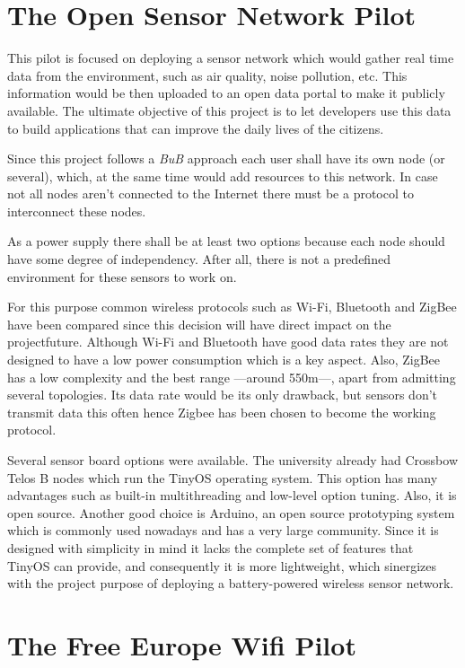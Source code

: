 \documentclass[draftclsnofoot,12pt,journal,onecolumn]{IEEEtran}
\begin{document}
\section{The Open Sensor Network Pilot}

This pilot is focused on deploying a sensor network which would gather real time data from the environment, such as air quality, noise pollution, etc. This information would be then uploaded to an open data portal to make it publicly available. The ultimate objective of this project is to let developers use this data to build applications that can improve the daily lives of the citizens.

Since this project follows a \emph{BuB} approach each user shall have its own node (or several), which, at the same time would add resources to this network. In case not all nodes aren't connected to the Internet there must be a protocol to interconnect these nodes.

As a power supply there shall be at least two options because each node should have some degree of independency. After all, there is not a predefined environment for these sensors to work on.

For this purpose common wireless protocols such as Wi-Fi, Bluetooth and ZigBee have been compared since this decision will have direct impact on the projectfuture. Although Wi-Fi and Bluetooth have good data rates they are not designed to have a low power consumption which is a key aspect. Also, ZigBee has a low complexity and the best range ---around 550m---, apart from admitting several topologies. Its data rate would be its only drawback, but sensors don't transmit data this often hence Zigbee has been chosen to become the working protocol.

Several sensor board options were available. The university already had Crossbow Telos B nodes which run the TinyOS operating system. This option has many advantages such as built-in multithreading and low-level option tuning. Also, it is open source. Another good choice is Arduino, an open source prototyping system which is commonly used nowadays and has a very large community. Since it is designed with simplicity in mind it lacks the complete set of features that TinyOS can provide, and consequently it is more lightweight, which sinergizes with the project purpose of deploying a battery-powered wireless sensor network.

\section{The Free Europe Wifi Pilot}
\end{document}
